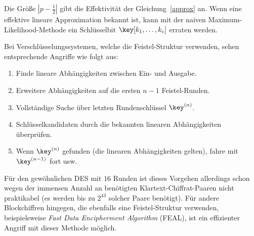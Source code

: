 Die Größe $\left|{p-\frac{1}{2}}\right|$ gibt die Effektivität der
Gleichung~\ref{approx} an. Wenn eine effektive lineare Approximation
bekannt ist, kann mit der naiven Maximum-Likelihood-Methode ein
Schlüsselbit $\key[k_1,\dots, k_c]$ erraten werden. 

Bei Verschlüsselungssystemen, welche die Feistel-Struktur\indexFeistel
verwenden, sehen entsprechende Angriffe wie folgt aus: 
\begin{enumerate}
\item Finde lineare Abhängigkeiten zwischen Ein- und Ausgabe.
\item Erweitere Abhängigkeiten auf die ersten $n-1$ Feistel-Runden.
\item Vollständige Suche über letzten Rundenschlüssel $\key^{(n)}$.
\item Schlüsselkandidaten durch die bekannten linearen Abhängigkeiten überprüfen.
\item Wenn $\key^{(n)}$ gefunden (\dh die linearen Abhängigkeiten
  gelten), fahre mit $\key^{(n-1)}$ fort usw. 
\end{enumerate}

Für den gewöhnlichen DES mit $16$ Runden ist dieses Vorgehen allerdings
schon wegen der immensen Anzahl an benötigten Klartext-Chiffrat-Paaren
nicht praktikabel (es werden bis zu $2^{43}$ solcher Paare
benötigt). Für andere Blockchiffren hingegen, die ebenfalls eine
Feistel-Struktur verwenden, beispielsweise \emph{Fast Data Encipherment
  Algorithm} (FEAL), ist ein effizienter Angriff mit dieser Methode
möglich. 

